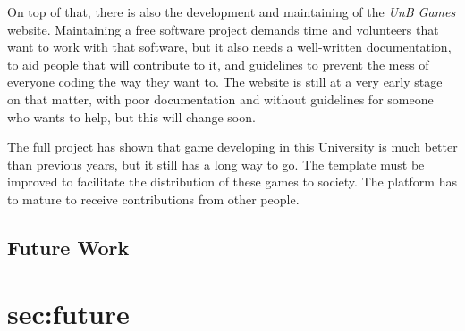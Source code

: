 On top of that, there is also the development and maintaining of the \textit{UnB Games} website. Maintaining a free software project demands time and volunteers that want to work with that software, but it also needs a well-written documentation, to aid people that will contribute to it, and guidelines to prevent the mess of everyone coding the way they want to. The website is still at a very early stage on that matter, with poor documentation and without guidelines for someone who wants to help, but this will change soon.

The full project has shown that game developing in this University is much better than previous years, but it still has a long way to go. The template must be improved to facilitate the distribution of these games to society. The platform has to mature to receive contributions from other people.


\subsection*{Future Work}
\section{sec:future}
